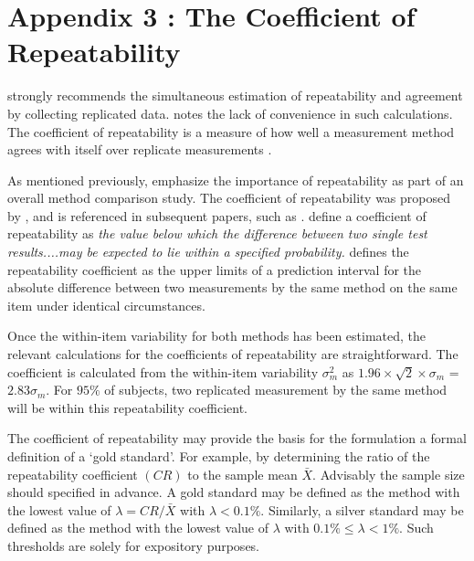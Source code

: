 \documentclass[12pt, a4paper]{report}
\theoremstyle{plain}
\theoremstyle{definition}
\theoremstyle{remark}
\begin{document}
  
  \section{Appendix 3 : The Coefficient of Repeatability}
  
  
  \citet{BA99} strongly recommends the simultaneous estimation of repeatability and agreement by  collecting replicated data. \citet{ARoy2009} notes the lack of convenience in such calculations. The coefficient of repeatability is a measure of how well a measurement method agrees with itself over replicate measurements \citep{BA99}. 
  
  As mentioned previously, \citet{Barnhart} emphasize the importance of repeatability as part of an overall method comparison study. The coefficient of repeatability was proposed by \citet{BA99}, and is referenced in subsequent papers, such as \citet{BXC2008}. \citet{BSIrepeat} define a coefficient of
  repeatability as \emph{the value below which the difference between two single test results....may be expected to lie within a specified probability.} \citet{BA99} defines the repeatability coefficient as the upper limits of a prediction interval for the absolute difference between two measurements by the same method on the same item under identical circumstances. %
  
  Once the within-item variability for both methods has been estimated, the relevant calculations for the coefficients of repeatability are straightforward.
  The coefficient is calculated from the within-item variability $\sigma^2_{m}$ as  $1.96 \times \sqrt{2} \times \sigma_m$ = $2.83 \sigma_m$. For $95\%$ of subjects, two replicated measurement by the same method will be within this repeatability coefficient.
  
  
  The coefficient of repeatability may provide the basis for the formulation a formal definition of a `gold standard'. For example, by determining the ratio of the repeatability coefficient $(CR)$ to the sample mean $\bar{X}$. Advisably the sample size should specified in advance. A gold standard may be defined as the method with the lowest value of $\lambda = CR /\bar{X}$ with $\lambda < 0.1\%$. Similarly, a silver standard may be defined as the method with the lowest value of $\lambda $ with $0.1\% \leq \lambda < 1\%$. Such thresholds are solely for expository purposes.
  
\end{document}
